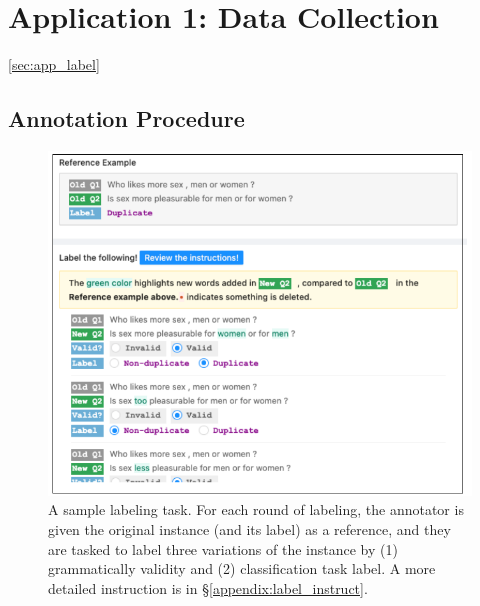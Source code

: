 \section{Application 1: Data Collection}
\ref{sec:app_label}

\subsection{Annotation Procedure}

\begin{figure}[t]
\centering
\includegraphics[width=1\columnwidth]{figures/mturk_label}
\vspace{-15pt}
\caption{A sample labeling task. For each round of labeling, the annotator is given the original instance (and its label) as a reference, and they are tasked to label three variations of the instance by (1) grammatically validity and (2) classification task label. A more detailed instruction is in \S\ref{appendix:label_instruct}. }
\vspace{-10pt}
\label{fig:mturk_instruction}
\end{figure}

